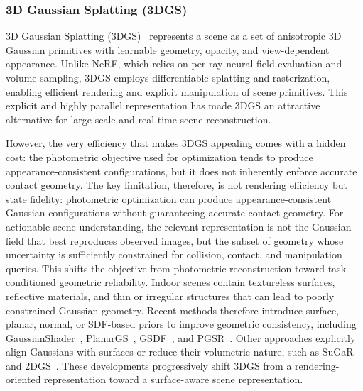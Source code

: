 \documentclass{SCIS2026}
\begin{document}
\subsubsection{3D Gaussian Splatting (3DGS)}

3D Gaussian Splatting (3DGS)~\cite{kerbl20233d} represents a scene as a set of anisotropic 3D Gaussian primitives with learnable geometry, opacity, and view-dependent appearance. Unlike NeRF, which relies on per-ray neural field evaluation and volume sampling, 3DGS employs differentiable splatting and rasterization, enabling efficient rendering and explicit manipulation of scene primitives. This explicit and highly parallel representation has made 3DGS an attractive alternative for large-scale and real-time scene reconstruction.

However, the very efficiency that makes 3DGS appealing comes with a hidden cost: the photometric objective used for optimization tends to produce appearance-consistent configurations, but it does not inherently enforce accurate contact geometry. The key limitation, therefore, is not rendering efficiency but state fidelity: photometric optimization can produce appearance-consistent Gaussian configurations without guaranteeing accurate contact geometry. For actionable scene understanding, the relevant representation is not the Gaussian field that best reproduces observed images, but the subset of geometry whose uncertainty is sufficiently constrained for collision, contact, and manipulation queries. This shifts the objective from photometric reconstruction toward task-conditioned geometric reliability. Indoor scenes contain textureless surfaces, reflective materials, and thin or irregular structures that can lead to poorly constrained Gaussian geometry. Recent methods therefore introduce surface, planar, normal, or SDF-based priors to improve geometric consistency, including GaussianShader~\cite{jiang2024gaussianshader}, PlanarGS~\cite{jin2025planargs}, GSDF~\cite{yu2024gsdf}, and PGSR~\cite{chen2024pgsr}. Other approaches explicitly align Gaussians with surfaces or reduce their volumetric nature, such as SuGaR~\cite{guedon2024sugar} and 2DGS~\cite{huang20242d}. These developments progressively shift 3DGS from a rendering-oriented representation toward a surface-aware scene representation.
\end{document}
